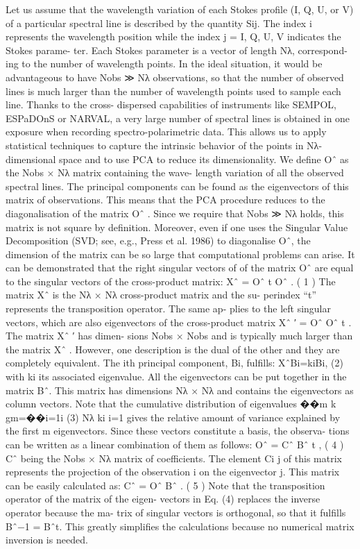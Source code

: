 Let us assume that the wavelength variation of each Stokes profile (I, Q, U, or V) of a particular spectral line is described by the quantity Sij. The index i represents the wavelength position while the index j = {I, Q, U, V} indicates the Stokes parame- ter. Each Stokes parameter is a vector of length Nλ, correspond- ing to the number of wavelength points. In the ideal situation, it would be advantageous to have Nobs ≫ Nλ observations, so that the number of observed lines is much larger than the number of wavelength points used to sample each line. Thanks to the cross- dispersed capabilities of instruments like SEMPOL, ESPaDOnS or NARVAL, a very large number of spectral lines is obtained in one exposure when recording spectro-polarimetric data. This allows us to apply statistical techniques to capture the intrinsic behavior of the points in Nλ-dimensional space and to use PCA to reduce its dimensionality.
We define Oˆ as the Nobs × Nλ matrix containing the wave- length variation of all the observed spectral lines. The principal components can be found as the eigenvectors of this matrix of observations. This means that the PCA procedure reduces to the diagonalisation of the matrix Oˆ . Since we require that Nobs ≫ Nλ holds, this matrix is not square by definition. Moreover, even if one uses the Singular Value Decomposition (SVD; see, e.g., Press et al. 1986) to diagonalise Oˆ, the dimension of the matrix can be so large that computational problems can arise. It can be demonstrated that the right singular vectors of of the matrix Oˆ are equal to the singular vectors of the cross-product matrix:
Xˆ = Oˆ t Oˆ . ( 1 )
The matrix Xˆ is the Nλ × Nλ cross-product matrix and the su- perindex “t” represents the transposition operator. The same ap- plies to the left singular vectors, which are also eigenvectors of the cross-product matrix Xˆ ′ = Oˆ Oˆ t . The matrix Xˆ ′ has dimen- sions Nobs × Nobs and is typically much larger than the matrix Xˆ . However, one description is the dual of the other and they are completely equivalent. The ith principal component, Bi, fulfills:
XˆBi=kiBi, (2)
with ki its associated eigenvalue. All the eigenvectors can be put together in the matrix Bˆ. This matrix has dimensions Nλ × Nλ and contains the eigenvectors as column vectors. Note that the cumulative distribution of eigenvalues
��m k
gm=��i=1i (3)
Nλ ki i=1
gives the relative amount of variance explained by the first m eigenvectors. Since these vectors constitute a basis, the observa- tions can be written as a linear combination of them as follows:
Oˆ = Cˆ Bˆ t , ( 4 )
Cˆ being the Nobs × Nλ matrix of coefficients. The element Ci j of this matrix represents the projection of the observation i on the eigenvector j. This matrix can be easily calculated as:
Cˆ = Oˆ Bˆ . ( 5 )
Note that the transposition operator of the matrix of the eigen- vectors in Eq. (4) replaces the inverse operator because the ma- trix of singular vectors is orthogonal, so that it fulfills Bˆ−1 = Bˆt. This greatly simplifies the calculations because no numerical matrix inversion is needed.

